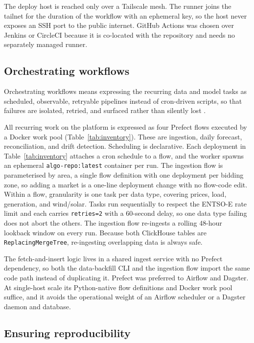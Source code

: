 The deploy host is reached only over a Tailscale mesh. The runner joins the
tailnet for the duration of the workflow with an ephemeral key, so the host
never exposes an SSH port to the public internet. GitHub Actions was chosen
over Jenkins or CircleCI because it is co-located with the repository and needs
no separately managed runner.

\subsection{Orchestrating workflows}

Orchestrating workflows means expressing the recurring data and model tasks as
scheduled, observable, retryable pipelines instead of cron-driven scripts, so
that failures are isolated, retried, and surfaced rather than silently lost
\cite{zarour2025}.

All recurring work on the platform is expressed as four Prefect flows executed
by a Docker work pool (Table~\ref{tab:inventory}). These are ingestion, daily
forecast, reconciliation, and drift detection. Scheduling is declarative. Each deployment in
Table~\ref{tab:inventory} attaches a cron schedule to a flow, and the worker
spawns an ephemeral \texttt{algo-repo:latest} container per run. The ingestion
flow is parameterised by area, a single flow definition with one deployment per
bidding zone, so adding a market is a one-line deployment change with no
flow-code edit.
Within a flow, granularity is one task per data type, covering prices, load,
generation, and wind/solar. Tasks run sequentially to respect the ENTSO-E rate limit and
each carries \texttt{retries=2} with a 60-second delay, so one data type
failing does not abort the others. The ingestion flow re-ingests a rolling
48-hour lookback window on every run. Because both ClickHouse tables are
\texttt{ReplacingMergeTree}, re-ingesting overlapping data is always safe.

The fetch-and-insert logic lives in a shared ingest service with no Prefect
dependency, so both the data-backfill CLI and the ingestion flow import the same
code path instead of duplicating it.
Prefect was preferred to Airflow and Dagster. At single-host scale its
Python-native flow definitions and Docker work pool suffice, and it avoids the
operational weight of an Airflow scheduler or a Dagster daemon and database.

\subsection{Ensuring reproducibility}

